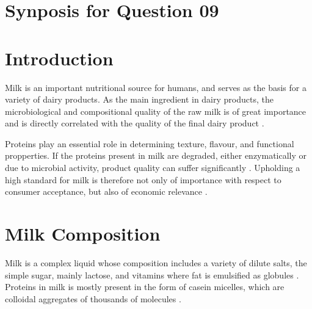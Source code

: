 \setcounter{chapter}{2}
\setcounter{section}{0}
\section*{Synposis for Question 09}

\section{Introduction}
Milk is an important nutritional source for humans, and serves as the basis for a variety of dairy products. As the main ingredient in dairy products, the microbiological and compositional quality of  the raw milk is of great importance and is directly correlated with the quality of the final dairy product \cite*{a01_protein_degradation_in_bovine_milk}. 

Proteins play an essential role in determining texture, flavour, and functional propperties. If the proteins present in milk are degraded, either enzymatically or due to microbial activity, product quality can suffer significantly \cite*{a02_proteases_and_protein_degradation}. Upholding a high standard for milk is therefore not only of importance with respect to consumer acceptance, but also of economic relevance \cite*{a01_protein_degradation_in_bovine_milk}.








\section{Milk Composition}
Milk is a complex liquid whose composition includes a variety of dilute salts, the simple sugar, mainly lactose, and vitamins where fat is emulsified as globules \cite*{a04_bovine_milk_in_human_nutrition}. Proteins in milk is mostly present in the form of casein micelles, which are colloidal aggregates of thousands of molecules \cite*{b01_milk_biochemistry}.

